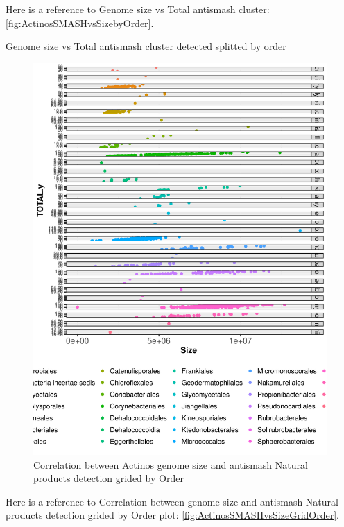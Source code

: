 \documentclass[12pt,twoside]{reedthesis}
\begin{document}
  Here is a reference to Genome size vs Total antismash cluster:
  \autoref{fig:ActinosSMASHvsSizebyOrder}. \clearpage
  
  Genome size vs Total antismash cluster detected splitted by order
  
  \begin{figure}[h!tbp]
  \centering
  \includegraphics[angle = 0,scale = 0.6]{chapter2/Actinobacteria/ActinosSMASHvsSizeGridOrder.pdf}
  \caption[Correlation between Actinos genome size and antismash Natural products detection grided by Order]{\normalsize{Correlation between Actinos genome size and antismash Natural products detection grided by Order}}
  \label{fig:ActinosSMASHvsSizeGridOrder}
  \end{figure}
  
  Here is a reference to Correlation between genome size and antismash
  Natural products detection grided by Order plot:
  \autoref{fig:ActinosSMASHvsSizeGridOrder}. \clearpage 
  
\end{document}

